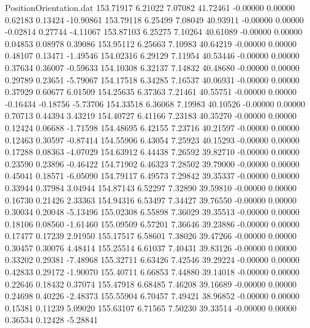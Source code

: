 \begin{filecontents}{PositionOrientation.dat}
 153.71917    6.21022    7.07082    41.72461   -0.00000    0.00000    0.62183    0.13424  -10.90861
 153.79118    6.25499    7.08049    40.93911   -0.00000    0.00000   -0.02814    0.27744   -4.11067
 153.87103    6.25275    7.10264    40.61089   -0.00000    0.00000    0.04853    0.08978    0.39086
 153.95112    6.25663    7.10983    40.64219   -0.00000    0.00000    0.48107    0.13471   -1.49546
 154.02316    6.29129    7.11954    40.53446   -0.00000    0.00000    0.37634    0.36007   -0.59633
 154.10308    6.32137    7.14832    40.48680   -0.00000    0.00000    0.29789    0.23651   -5.79067
 154.17518    6.34285    7.16537    40.06931   -0.00000    0.00000    0.37929    0.60677    6.01509
 154.25635    6.37363    7.21461    40.55751   -0.00000    0.00000   -0.16434   -0.18756   -5.73706
 154.33518    6.36068    7.19983    40.10526   -0.00000    0.00000    0.70713    0.44394    3.43219
 154.40727    6.41166    7.23183    40.35270   -0.00000    0.00000    0.12424    0.06688   -1.71598
 154.48695    6.42155    7.23716    40.21597   -0.00000    0.00000    0.12463    0.30597   -0.87414
 154.55906    6.43054    7.25923    40.15293   -0.00000    0.00000    0.17288    0.08363   -4.07029
 154.63912    6.44438    7.26592    39.82710   -0.00000    0.00000    0.23590    0.23896   -0.46422
 154.71902    6.46323    7.28502    39.79000   -0.00000    0.00000    0.45041    0.18571   -6.05090
 154.79117    6.49573    7.29842    39.35337   -0.00000    0.00000    0.33944    0.37984    3.04944
 154.87143    6.52297    7.32890    39.59810   -0.00000    0.00000    0.16730    0.21426    2.33363
 154.94316    6.53497    7.34427    39.76550   -0.00000    0.00000    0.30034    0.20048   -5.13496
 155.02308    6.55898    7.36029    39.35513   -0.00000    0.00000    0.18106    0.08560   -1.61460
 155.09509    6.57201    7.36646    39.23886   -0.00000    0.00000    0.17477    0.17239    2.91950
 155.17517    6.58601    7.38026    39.47266   -0.00000    0.00000    0.30457    0.30076    4.48414
 155.25514    6.61037    7.40431    39.83126   -0.00000    0.00000    0.33202    0.29381   -7.48968
 155.32711    6.63426    7.42546    39.29224   -0.00000    0.00000    0.42833    0.29172   -1.90070
 155.40711    6.66853    7.44880    39.14018   -0.00000    0.00000    0.22646    0.18432    0.37074
 155.47918    6.68485    7.46208    39.16689   -0.00000    0.00000    0.24698    0.40226   -2.48373
 155.55904    6.70457    7.49421    38.96852   -0.00000    0.00000    0.15381    0.11239    5.09020
 155.63107    6.71565    7.50230    39.33514   -0.00000    0.00000    0.36534    0.12428   -5.28841

\end{filecontents}
